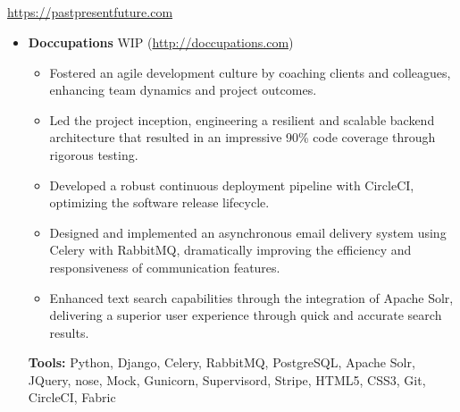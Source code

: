 \documentclass[11pt,a4paper,english]{moderncv}
\begin{document}
\subsection{}

{
\url{https://pastpresentfuture.com}
\newline{}
\begin{itemize}
    \item \textbf{Doccupations}
        \newline{}
        WIP (\url{http://doccupations.com})
        \begin{itemize}
            \item Fostered an agile development culture by coaching clients and colleagues, enhancing team dynamics and project outcomes.
            \item Led the project inception, engineering a resilient and scalable backend architecture that resulted in an impressive 90\% code coverage through rigorous testing.
            \item Developed a robust continuous deployment pipeline with CircleCI, optimizing the software release lifecycle.
            \item Designed and implemented an asynchronous email delivery system using Celery with RabbitMQ, dramatically improving the efficiency and responsiveness of communication features.
            \item Enhanced text search capabilities through the integration of Apache Solr, delivering a superior user experience through quick and accurate search results.
        \end{itemize}
        \textbf{Tools:} Python, Django, Celery, RabbitMQ, PostgreSQL, Apache Solr, JQuery, nose, Mock, Gunicorn, Supervisord, Stripe, HTML5, CSS3, Git, CircleCI, Fabric
\end{itemize}
}

\subsection{}
\end{document}
